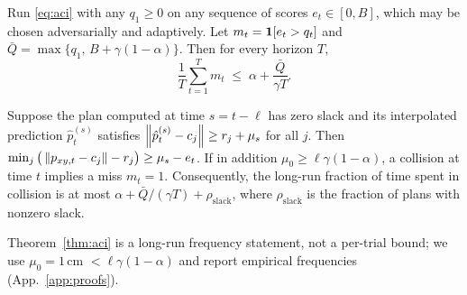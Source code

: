 \begin{theorem}
\label{thm:aci}
Run \eqref{eq:aci} with any $q_1\ge 0$ on any sequence of scores $e_t\in[0,B]$, which may be chosen adversarially and adaptively. Let $m_t=\mathbf{1}[e_t>q_t]$ and $\bar Q=\max\{q_1,\,B+\gamma(1-\alpha)\}$. Then for every horizon $T$,
\begin{equation}
  \frac1T\sum_{t=1}^T m_t \;\le\; \alpha+\frac{\bar Q}{\gamma T}.
\end{equation}
\end{theorem}
\begin{corollary}
\label{cor:safety}
Suppose the plan computed at time $s=t-\ell$ has zero slack and its interpolated prediction $\hat p^{(s)}_t$ satisfies $\left\lVert \hat p^{(s)}_t-c_j \right\rVert\ge r_j+\mu_s$ for all $j$. Then $\min_j\big(\left\lVert p_{xy,t}-c_j \right\rVert-r_j\big)\ge\mu_s-e_t$.
If in addition $\mu_0\ge\ell\gamma(1-\alpha)$, a collision at time $t$ implies a miss $m_t=1$. Consequently, the long-run fraction of time spent in collision is at most $\alpha+\bar Q/(\gamma T)+\rho_{\mathrm{slack}}$, where $\rho_{\mathrm{slack}}$ is the fraction of plans with nonzero slack.
\end{corollary}
Theorem~\ref{thm:aci} is a long-run frequency statement, not a per-trial bound; we use $\mu_0=1$\,cm $<\ell\gamma(1-\alpha)$ and report empirical frequencies (App.~\ref{app:proofs}).
